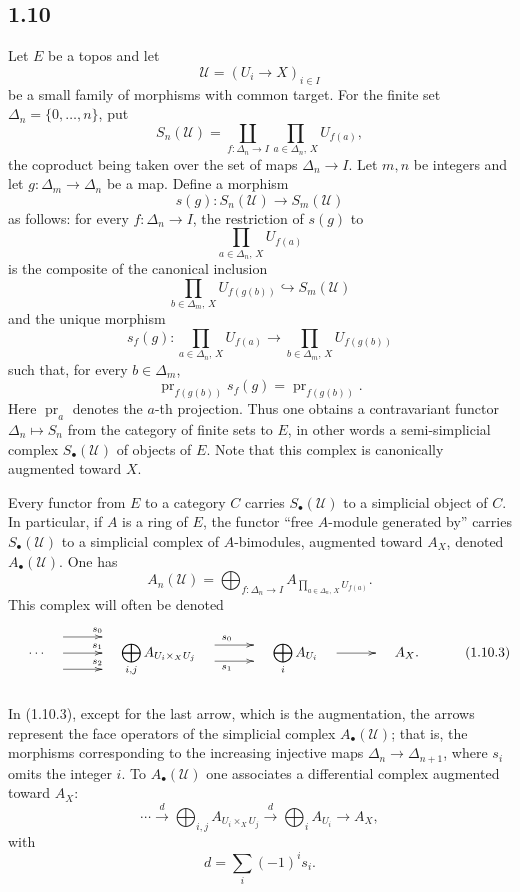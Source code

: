 \documentclass[11pt]{article}
\newcommand{\pr}{\operatorname{pr}}
\begin{document}
\subsection*{1.10}

Let $E$ be a topos and let
\[
\mathcal U=(U_i\to X)_{i\in I}
\]
be a small family of morphisms with common target. For the finite set $\Delta_n=\{0,\ldots,n\}$, put
\[
S_n(\mathcal U)=
\coprod_{f:\Delta_n\to I}\prod_{a\in \Delta_n,\,X}U_{f(a)},
\]
the coproduct being taken over the set of maps $\Delta_n\to I$. Let $m,n$ be integers and let $g:\Delta_m\to \Delta_n$ be a map. Define a morphism
\[
s(g):S_n(\mathcal U)\longrightarrow S_m(\mathcal U)
\tag{1.10.1}
\]
as follows: for every $f:\Delta_n\to I$, the restriction of $s(g)$ to
\[
\prod_{a\in \Delta_n,\,X} U_{f(a)}
\]
is the composite of the canonical inclusion
\[
\prod_{b\in \Delta_m,\,X}U_{f(g(b))}\hookrightarrow S_m(\mathcal U)
\]
and the unique morphism
\[
s_f(g):\prod_{a\in \Delta_n,\,X}U_{f(a)}
\longrightarrow
\prod_{b\in \Delta_m,\,X}U_{f(g(b))}
\]
such that, for every $b\in\Delta_m$,
\[
\pr_{f(g(b))}s_f(g)=\pr_{f(g(b))}.
\]
Here $\pr_a$ denotes the $a$-th projection. Thus one obtains a contravariant functor $\Delta_n\mapsto S_n$ from the category of finite sets to $E$, in other words a semi-simplicial complex $S_\bullet(\mathcal U)$ of objects of $E$. Note that this complex is canonically augmented toward $X$.

Every functor from $E$ to a category $C$ carries $S_\bullet(\mathcal U)$ to a simplicial object of $C$. In particular, if $A$ is a ring of $E$, the functor ``free $A$-module generated by'' carries $S_\bullet(\mathcal U)$ to a simplicial complex of $A$-bimodules, augmented toward $A_X$, denoted $A_\bullet(\mathcal U)$. One has
\[
A_n(\mathcal U)=
\bigoplus_{f:\Delta_n\to I} A_{\prod_{a\in \Delta_n,\,X}U_{f(a)}} .
\tag{1.10.2}
\]
This complex will often be denoted
\[
\xymatrix@C=1cm@M=.5cm{
\cdots \ar@<12pt>[r]^{s_0}\ar[r]^{s_1}\ar@<-12pt>[r]^{s_2}&
\displaystyle\bigoplus_{i,j} A_{U_i\times_X U_j}
\ar@<6pt>[r]^{s_0}\ar@<-6pt>[r]_{s_1}&
\displaystyle\bigoplus_i A_{U_i}\ar[r]&A_X .
}
\tag{1.10.3}
\]
In (1.10.3), except for the last arrow, which is the augmentation, the arrows represent the face operators of the simplicial complex $A_\bullet(\mathcal U)$; that is, the morphisms corresponding to the increasing injective maps $\Delta_n\to\Delta_{n+1}$, where $s_i$ omits the integer $i$. To $A_\bullet(\mathcal U)$ one associates a differential complex augmented toward $A_X$:
\[
\cdots\xrightarrow{d}\bigoplus_{i,j}A_{U_i\times_X U_j}
\xrightarrow{d}\bigoplus_i A_{U_i}\longrightarrow A_X,
\tag{1.10.4}
\]
with
\[
d=\sum_i(-1)^i s_i .
\tag{1.10.5}
\]
\end{document}
